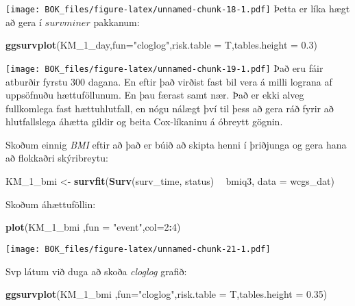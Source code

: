 \documentclass[
]{book}
\newenvironment{Shaded}{\begin{snugshade}}{\end{snugshade}}
\newcommand{\DataTypeTok}[1]{\textcolor[rgb]{0.13,0.29,0.53}{#1}}
\newcommand{\DecValTok}[1]{\textcolor[rgb]{0.00,0.00,0.81}{#1}}
\newcommand{\FloatTok}[1]{\textcolor[rgb]{0.00,0.00,0.81}{#1}}
\newcommand{\KeywordTok}[1]{\textcolor[rgb]{0.13,0.29,0.53}{\textbf{#1}}}
\newcommand{\NormalTok}[1]{#1}
\newcommand{\OperatorTok}[1]{\textcolor[rgb]{0.81,0.36,0.00}{\textbf{#1}}}
\newcommand{\StringTok}[1]{\textcolor[rgb]{0.31,0.60,0.02}{#1}}
\begin{document}
\texttt{[image: BOK\_files/figure-latex/unnamed-chunk-18-1.pdf]}
Þetta er líka hægt að gera í \(survminer\) pakkanum:

\begin{Shaded}
\begin{Highlighting}[]
\KeywordTok{ggsurvplot}\NormalTok{(KM_}\DecValTok{1}\NormalTok{_day,}\DataTypeTok{fun=}\StringTok{"cloglog"}\NormalTok{,}\DataTypeTok{risk.table =}\NormalTok{ T,}\DataTypeTok{tables.height =} \FloatTok{0.3}\NormalTok{)}
\end{Highlighting}
\end{Shaded}

\texttt{[image: BOK\_files/figure-latex/unnamed-chunk-19-1.pdf]}
Það eru fáir atburðir fyrstu 300 dagana. En eftir það virðist fast bil vera á milli lograna af uppsöfnuðu hættuföllunum. En þau færast samt nær. Það er ekki alveg fullkomlega fast hættuhlutfall, en nógu nálægt því til þess að gera ráð fyrir að hlutfallslega áhætta gildir og beita Cox-líkaninu á óbreytt gögnin.

Skoðum einnig \emph{BMI} eftir að það er búið að skipta henni í þriðjunga og gera hana að flokkaðri skýribreytu:

\begin{Shaded}
\begin{Highlighting}[]
\NormalTok{KM_}\DecValTok{1}\NormalTok{_bmi <-}\StringTok{ }\KeywordTok{survfit}\NormalTok{(}\KeywordTok{Surv}\NormalTok{(surv_time, status) }\OperatorTok{~}\StringTok{ }\NormalTok{bmiq3, }\DataTypeTok{data =}\NormalTok{ wcgs_dat)}
\end{Highlighting}
\end{Shaded}

Skoðum áhættuföllin:

\begin{Shaded}
\begin{Highlighting}[]
\KeywordTok{plot}\NormalTok{(KM_}\DecValTok{1}\NormalTok{_bmi ,}\DataTypeTok{fun =} \StringTok{"event"}\NormalTok{,}\DataTypeTok{col=}\DecValTok{2}\OperatorTok{:}\DecValTok{4}\NormalTok{)}
\end{Highlighting}
\end{Shaded}

\texttt{[image: BOK\_files/figure-latex/unnamed-chunk-21-1.pdf]}

Svp látum við duga að skoða \emph{cloglog} grafið:

\begin{Shaded}
\begin{Highlighting}[]
\KeywordTok{ggsurvplot}\NormalTok{(KM_}\DecValTok{1}\NormalTok{_bmi ,}\DataTypeTok{fun=}\StringTok{"cloglog"}\NormalTok{,}\DataTypeTok{risk.table =}\NormalTok{ T,}\DataTypeTok{tables.height =} \FloatTok{0.35}\NormalTok{)}
\end{Highlighting}
\end{Shaded}
\end{document}
